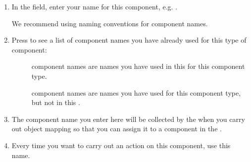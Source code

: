 \begin{enumerate}
\item In the  field, enter your name for this component, e.g. . 

We recommend using naming conventions for component names. 

\item Press  to see a list of component names you have already used for this type of component:

\begin{description}
\item[]{ component names are names you have used in this \gdcase{} for this component type. }
\item []{ component names are names you have used for this component type, but not in this \gdcase{}. }
 \end{description}


\item The component name you enter here will be collected by the \gdomeditor{} when you carry out object mapping so that you can assign it to a component in the \gdaut{}. 

\item Every time you want to carry out an action on this component, use this name. 
\end{enumerate}

